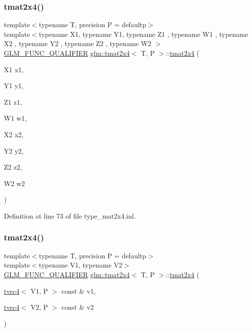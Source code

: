 \subsubsection{\texorpdfstring{tmat2x4()}{tmat2x4()}\hspace{0.1cm}{\footnotesize\ttfamily [20/22]}}
{\footnotesize\ttfamily template$<$typename T, precision P = defaultp$>$ \\
template$<$typename X1, typename Y1, typename Z1 , typename W1 , typename X2 , typename Y2 , typename Z2 , typename W2 $>$ \\
\mbox{\hyperlink{setup_8hpp_a33fdea6f91c5f834105f7415e2a64407}{G\+L\+M\+\_\+\+F\+U\+N\+C\+\_\+\+Q\+U\+A\+L\+I\+F\+I\+ER}} \mbox{\hyperlink{structglm_1_1tmat2x4}{glm\+::tmat2x4}}$<$ T, P $>$\+::\mbox{\hyperlink{structglm_1_1tmat2x4}{tmat2x4}} (\begin{DoxyParamCaption}\item[{X1}]{x1,  }\item[{Y1}]{y1,  }\item[{Z1}]{z1,  }\item[{W1}]{w1,  }\item[{X2}]{x2,  }\item[{Y2}]{y2,  }\item[{Z2}]{z2,  }\item[{W2}]{w2 }\end{DoxyParamCaption})}



Definition at line 73 of file type\+\_\+mat2x4.\+inl.

\mbox{\label{structglm_1_1tmat2x4_ac88d0804ec99669ad212426a520a6fee}} 
\subsubsection{\texorpdfstring{tmat2x4()}{tmat2x4()}\hspace{0.1cm}{\footnotesize\ttfamily [21/22]}}
{\footnotesize\ttfamily template$<$typename T, precision P = defaultp$>$ \\
template$<$typename V1, typename V2$>$ \\
\mbox{\hyperlink{setup_8hpp_a33fdea6f91c5f834105f7415e2a64407}{G\+L\+M\+\_\+\+F\+U\+N\+C\+\_\+\+Q\+U\+A\+L\+I\+F\+I\+ER}} \mbox{\hyperlink{structglm_1_1tmat2x4}{glm\+::tmat2x4}}$<$ T, P $>$\+::\mbox{\hyperlink{structglm_1_1tmat2x4}{tmat2x4}} (\begin{DoxyParamCaption}\item[{\mbox{\hyperlink{structglm_1_1tvec4}{tvec4}}$<$ V1, P $>$ const \&}]{v1,  }\item[{\mbox{\hyperlink{structglm_1_1tvec4}{tvec4}}$<$ V2, P $>$ const \&}]{v2 }\end{DoxyParamCaption})}




